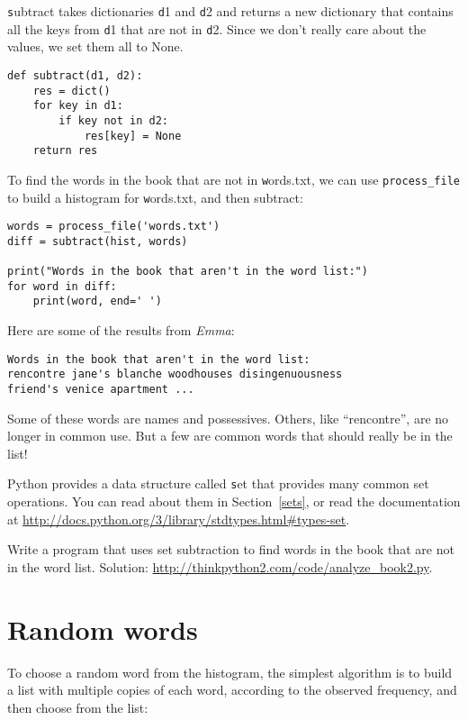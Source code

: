 \documentclass[
DIV=11,
fontsize=12,
twoside,
headinclude=false,
titlepage=firstiscover,
abstract=true,
headsepline=true,
footsepline=true,
chapterprefix=true, %
headings=big,
bibliography=totoc,%
captions=tableheading
]{scrbook}
\theoremstyle{definition}
\begin{document}
{\texttt subtract} takes dictionaries {\texttt d1} and {\texttt d2} and returns a
new dictionary that contains all the keys from {\texttt d1} that are not
in {\texttt d2}.  Since we don't really care about the values, we
set them all to None.

\begin{lstlisting}
def subtract(d1, d2):
    res = dict()
    for key in d1:
        if key not in d2:
            res[key] = None
    return res
\end{lstlisting}
%
To find the words in the book that are not in {\texttt words.txt},
we can use \verb"process_file" to build a histogram for
{\texttt words.txt}, and then subtract:

\begin{lstlisting}
words = process_file('words.txt')
diff = subtract(hist, words)

print("Words in the book that aren't in the word list:")
for word in diff:
    print(word, end=' ')
\end{lstlisting}
%
Here are some of the results from {\em Emma}:

\begin{lstlisting}
Words in the book that aren't in the word list:
rencontre jane's blanche woodhouses disingenuousness 
friend's venice apartment ...
\end{lstlisting}
%
Some of these words are names and possessives.  Others, like
``rencontre'', are no longer in common use.  But a few are common
words that should really be in the list!

\begin{exercise}
\normalfont
{}

Python provides a data structure called {\texttt set} that provides many
common set operations.  You can read about them in Section~\ref{sets},
or read the documentation at
\url{http://docs.python.org/3/library/stdtypes.html#types-set}.

Write a program that uses set subtraction to find words in the book
that are not in the word list.  Solution:
\url{http://thinkpython2.com/code/analyze_book2.py}.

\end{exercise}


\section{Random words}
\label{randomwords}

To choose a random word from the histogram, the simplest algorithm
is to build a list with multiple copies of each word, according
to the observed frequency, and then choose from the list:
\end{document}

